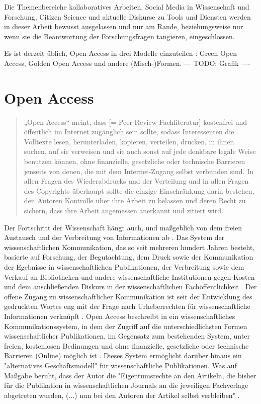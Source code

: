 Die Themenbereiche kollaboratives Arbeiten, Social Media in Wissenschaft und Forschung, Citizen Science und aktuelle Diskurse zu Tools und Diensten werden in dieser Arbeit bewusst ausgelassen und nur am Rande, beziehungsweise nur wenn sie die Beantwortung der Forschungsfragen tangieren, eingeschlossen.

Es ist derzeit üblich, Open Access in drei Modelle einzuteilen \cite{suchen}: Green Open Access, Golden Open Access und andere (Misch-)Formen. --- TODO: Grafik ----

\section{Open Access} 

\begin{quote}
„Open Access“ meint, dass [= Peer-Review-Fachliteratur] kostenfrei und öffentlich im Internet zugänglich sein sollte, sodass Interessenten die Volltexte lesen, herunterladen, kopieren, verteilen, drucken, in ihnen suchen, auf sie verweisen und sie auch sonst auf jede denkbare legale Weise benutzen können, ohne finanzielle, gesetzliche oder technische Barrieren jenseits von denen, die mit dem Internet-Zugang selbst verbunden sind. In allen Fragen des Wiederabdrucks und der Verteilung und in allen Fragen des Copyrights überhaupt sollte die einzige Einschränkung darin bestehen, den Autoren Kontrolle über ihre Arbeit zu belassen und deren Recht zu sichern, dass ihre Arbeit angemessen anerkannt und zitiert wird.
\cite{boai_2012}
\end{quote}
Der Fortschritt der Wissenschaft hängt auch, und maßgeblich von dem freien Austausch und der Verbreitung von Informationen ab \cite{cite:11}. Das System der wissenschaftlichen Kommunikation, das so seit mehreren hundert Jahren besteht, basierte auf Forschung, der Begutachtung, dem Druck sowie der Kommunikation der Egebnisse in wissenschaftlichen Publikationen, der Verbreitung sowie dem Verkauf an Bibliotheken und andere wissenschaftliche Institutionen gegen Kosten \cite{cite:11a} und dem anschließenden Diskurs in der wissenschaftlichen Fachöffentlichkeit \cite{suchen}. Der offene Zugang zu wissenschaftlicher Kommunikation ist seit der Entwicklung des gedruckten Wortes eng mit der Frage nach Urheberrechten für wissenschaftliche Informationen verknüpft \cite{Case_2000}. Open Access beschreibt in ein wissenschaftliches Kommunikationssystem, in dem der Zugriff auf die unterschiedlichsten Formen wissenschaftlicher Publikationen, im Gegensatz zum bestehenden System, unter freien, kostenlosen Bedinungen und ohne finanzielle, gesetzliche oder technische Barrieren (Online) möglich ist \cite{WD_bundestag_2009}. Dieses System ermöglicht darüber hinaus ein "alternatives Geschäftsmodell"\cite{lewis_2012_inevitability} für wissenschaftliche Publikationen. Was auf Maßgabe beruht, dass der Autor die "Eigentumsrechte an den Artikeln, die bisher für die Publikation in wissenschaftlichen Journals an die jeweiligen Fachverlage abgetreten wurden, (...) nun bei den Autoren der Artikel selbst verbleiben" \cite{Hess_2006}. 

